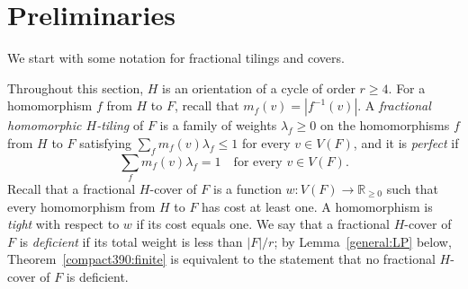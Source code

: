 \section{Preliminaries}\label{framework}
We start with some notation for fractional tilings and covers.

Throughout this section, $H$ is an orientation of a cycle of order $r\ge4$.
For a homomorphism
$f$ from $H$ to $F$, recall that $m_f(v)=|f^{-1}(v)|$. A \emph{fractional
homomorphic $H$-tiling} of $F$ is a family of weights $\lambda_f\ge0$ on the homomorphisms $f$ from $H$ to $F$ satisfying
$\sum_fm_f(v)\lambda_f\le1$ for every $v\in V(F)$, and it is \emph{perfect} if
\begin{equation}\label{framework390:loads}
 \sum_f m_f(v)\lambda_f=1\quad\text{for every }v\in V(F).
\end{equation}
Recall that a fractional $H$-cover of $F$ is a function $w:V(F)\to\mathbb R_{\ge0}$
such that every homomorphism from $H$ to $F$ has cost at least one.
A homomorphism is \emph{tight} with respect to $w$ if its cost equals one.
We say that a fractional $H$-cover of $F$ is \emph{deficient} if its total weight is less than $|F|/r$; by Lemma~\ref{general:LP} below, Theorem~\ref{compact390:finite} is equivalent to the statement that no fractional $H$-cover of $F$ is deficient.

